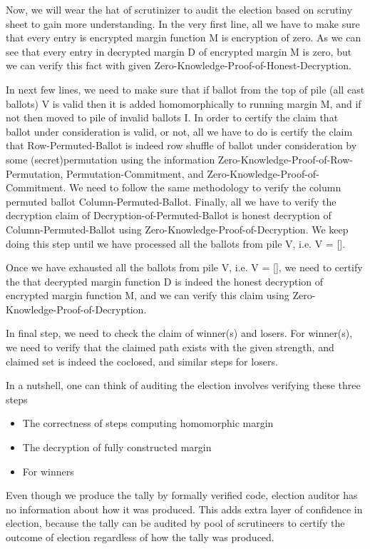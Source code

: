 \documentclass{llncs}
\begin{document}
Now, we will wear the hat of scrutinizer to audit the election based on 
 scrutiny sheet to gain more understanding. In the very first line, all we 
 have to make sure that every entry is encrypted margin function M is encryption 
 of zero. As we can see that every entry in decrypted margin D 
 of encrypted margin M is zero, but we can verify this fact with 
 given Zero-Knowledge-Proof-of-Honest-Decryption.
 
 In next few lines, we need to make sure that if ballot from the top of 
 pile (all cast ballots) V is valid then it is added homomorphically to 
 running margin M, 
 and if not then moved to pile of invalid ballots I. In 
 order to certify the claim that ballot under consideration is valid, 
 or not, all we have to do is certify the claim that Row-Permuted-Ballot 
 is indeed row shuffle of ballot under consideration by 
 some (secret)permutation using the information  
 Zero-Knowledge-Proof-of-Row-Permutation, Permutation-Commitment, and 
 Zero-Knowledge-Proof-of-Commitment. We need to follow the same methodology 
 to verify the column permuted ballot Column-Permuted-Ballot. Finally, 
 all we have to verify the decryption claim of Decryption-of-Permuted-Ballot
 is honest decryption of Column-Permuted-Ballot using 
 Zero-Knowledge-Proof-of-Decryption. We keep doing this step until we have 
 processed all the ballots from pile V, i.e. V = []. 
 
 Once we have exhausted all the ballots from pile V, i.e. V = [], we 
 need to certify the that decrypted margin function D is indeed the 
 honest decryption of encrypted margin function M, and we can 
 verify this claim using Zero-Knowledge-Proof-of-Decryption.
 
 In final step, we need to check the claim of winner(s) and losers. 
 For winner(s), we need to verify that the claimed path exists with 
 the given strength, and claimed set is indeed the coclosed, and similar
 steps for losers.

In a nutshell, one can 
think of auditing the election involves verifying these three steps
\begin{itemize}
 \item The correctness of steps computing homomorphic margin 
 \item The decryption of fully constructed margin
 \item For winners 
\end{itemize} 

Even though we produce the tally by formally verified code, election 
auditor has no information about how it was produced. This adds extra layer
of confidence in election, because the tally can be audited by pool
of scrutineers to certify the outcome of election regardless of how the tally 
was produced.
\end{document}

